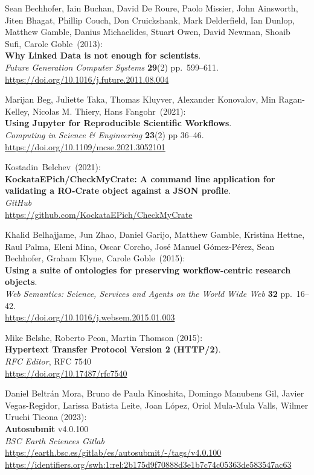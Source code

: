 \begin{thebibliography}{9}
Sean Bechhofer, Iain Buchan, David De Roure, Paolo Missier,
John Ainsworth, Jiten Bhagat, Phillip Couch, Don Cruickshank, Mark
Delderfield, Ian Dunlop, Matthew Gamble, Danius Michaelides, Stuart
Owen, David Newman, Shoaib Sufi, Carole Goble~(2013):\\
\textbf{Why Linked Data is not enough for scientists}.\\
\emph{Future Generation Computer Systems} \textbf{29}(2)
pp.~599--611.\\
\url{https://doi.org/10.1016/j.future.2011.08.004}

Marijan Beg, Juliette Taka, Thomas Kluyver, Alexander
Konovalov, Min Ragan-Kelley, Nicolas M. Thiery, Hans Fangohr~(2021):\\
\textbf{Using Jupyter for Reproducible Scientific Workflows}.\\
\emph{Computing in Science \& Engineering} \textbf{23}(2) pp 36--46.\\
\url{https://doi.org/10.1109/mcse.2021.3052101}

Kostadin~Belchev~(2021):\\
\textbf{KockataEPich/CheckMyCrate: A command line application for
validating a RO-Crate object against a JSON profile}.\\
\emph{GitHub}\\
\url{https://github.com/KockataEPich/CheckMyCrate}

Khalid Belhajjame, Jun Zhao, Daniel Garijo, Matthew Gamble,
Kristina Hettne, Raul Palma, Eleni Mina, Oscar Corcho, José Manuel
Gómez-Pérez, Sean Bechhofer, Graham Klyne, Carole Goble~(2015):\\
\textbf{Using a suite of ontologies for preserving workflow-centric
research objects}.\\
\emph{Web Semantics: Science, Services and Agents on the World Wide Web}
\textbf{32} pp.~16--42.\\
\url{https://doi.org/10.1016/j.websem.2015.01.003}

Mike Belshe, Roberto Peon, Martin Thomson (2015): \\
\textbf{Hypertext Transfer Protocol Version 2 (HTTP/2)}.\\
\emph{RFC Editor}, RFC 7540\\
\url{https://doi.org/10.17487/rfc7540}

 Daniel Beltrán Mora, Bruno de Paula Kinoshita, Domingo Manubens Gil, Javier Vegas-Regidor, Larissa Batista Leite, Joan López, Oriol Mula-Mula Valls, Wilmer Uruchi Ticona (2023):\\
\textbf{Autosubmit} v4.0.100\\
\emph{BSC Earth Sciences Gitlab}\\
\url{https://earth.bsc.es/gitlab/es/autosubmit/-/tags/v4.0.100}\\
\url{https://identifiers.org/swh:1:rel:2b175d9f70888d3e1b7c74c05363de583547ac63}


\end{thebibliography}
